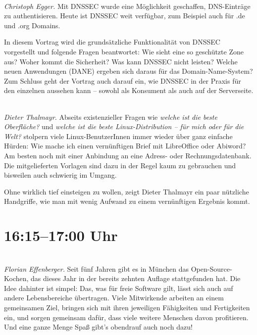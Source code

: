 \documentclass[10pt,a4paper,ngerman]{scrartcl}
\let\origdescription\description
\renewenvironment{description}{
  \setlength{\leftmargini}{0em}
  \origdescription
  \setlength{\itemindent}{0em}
  \setlength{\itemsep}{1.2em}
  \setlength{\labelsep}{\textwidth}
}
{\endlist}
\newcommand{\vorschub}{\mbox{}\\[-0.5em]}
\begin{document}
\begin{multicols*}{2}
\begin{description}
\item[DNSSEC]\vorschub
\textsl{Christoph Egger.}
Mit DNSSEC wurde eine Möglichkeit geschaffen, DNS-Einträge zu authentisieren. Heute ist DNSSEC weit verfügbar, zum Beispiel auch für .de und .org Domains.

In diesem Vortrag wird die grundsätzliche Funktionalität von DNSSEC vorgestellt und folgende Fragen beantwortet: Wie sieht eine so geschützte Zone aus? Woher kommt die Sicherheit? Was kann DNSSEC nicht leisten? Welche neuen Anwendungen (DANE) ergeben sich daraus für das Domain-Name-System?
Zum Schluss geht der Vortrag auch darauf ein, wie DNSSEC in der Praxis für den einzelnen aussehen kann -- sowohl als Konsument als auch auf der Serverseite.

\item[Schicke Briefe mit LibreOffice]\vorschub
\textsl{Dieter Thalmayr.} Abseits existenzieller Fragen wie \emph{welche ist die beste Oberfläche?} und \emph{welche ist die beste Linux-Distribution – für mich oder für die Welt?} stolpern viele Linux-BenutzerInnen immer wieder über ganz einfache Hürden: Wie mache ich einen vernünftigen Brief mit LibreOffice oder Abiword? Am besten noch mit einer Anbindung an eine Adress- oder Rechnungsdatenbank. Die mitgelieferten Vorlagen sind dazu in der Regel kaum zu gebrauchen und bisweilen auch schwierig im Umgang.

Ohne wirklich tief einsteigen zu wollen, zeigt Dieter Thalmayr ein paar nützliche Handgriffe, wie man mit wenig Aufwand zu einem vernünftigen Ergebnis kommt.

\end{description}

\columnbreak

\section{16:15--17:00 Uhr}

\begin{description}
\item[Open-Source-Kochen in München]\vorschub
\textsl{Florian Effenberger.}
Seit fünf Jahren gibt es in München das Open-Source-Kochen, das dieses Jahr in der bereits zehnten Auflage stattgefunden hat. Die Idee dahinter ist simpel: Das, was für freie Software gilt, lässt sich auch auf andere Lebensbereiche übertragen. Viele Mitwirkende arbeiten an einem gemeinsamen Ziel, bringen sich mit ihren jeweiligen Fähigkeiten und Fertigkeiten ein, und sorgen gemeinsam dafür, dass viele weitere Menschen davon profitieren. Und eine ganze Menge Spaß gibt's obendrauf auch noch dazu!


\end{description}
\end{multicols*}
\end{document}
